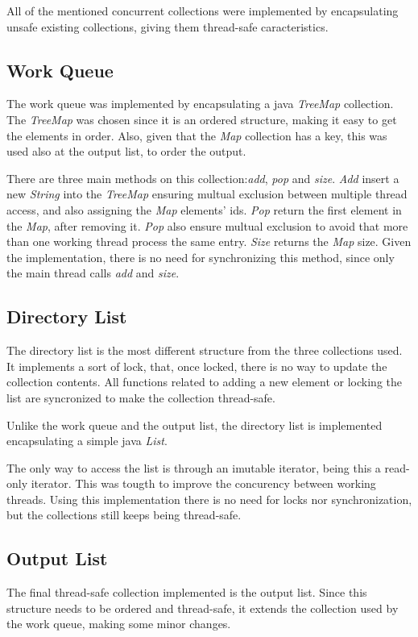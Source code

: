 \documentclass[twocolumn,20pt]{article}
\begin{document}
All of the mentioned concurrent collections were implemented by encapsulating unsafe existing collections, giving them thread-safe caracteristics.

\subsection{Work Queue}
The work queue was implemented by encapsulating a java \textit{TreeMap} collection. The \textit{TreeMap} was chosen since it is an ordered structure, making it easy to get the elements in order. Also, given that the \textit{Map} collection has a key, this was used also at the output list, to order the output.

There are three main methods on this collection:\textit{add}, \textit{pop} and \textit{size}. \textit{Add} insert a new \textit{String} into the \textit{TreeMap} ensuring multual exclusion between multiple thread access, and also assigning the \textit{Map} elements' ids. \textit{Pop} return the first element in the \textit{Map}, after removing it. \textit{Pop} also ensure multual exclusion to avoid that more than one working thread process the same entry. \textit{Size} returns the \textit{Map} size. Given the implementation, there is no need for synchronizing this method, since only the main thread calls \textit{add} and \textit{size}.

\subsection{Directory List}
The directory list is the most different structure from the three collections used. It implements a sort of lock, that, once locked, there is no way to update the collection contents. All functions related to adding a new element or locking the list are syncronized to make the collection thread-safe.

Unlike the work queue and the output list, the directory list is implemented encapsulating a simple java \textit{List}.

The only way to access the list is through an imutable iterator, being this a read-only iterator. This was tougth to improve the concurency between working threads. Using this implementation there is no need for locks nor synchronization, but the collections still keeps being thread-safe.

\subsection{Output List}
The final thread-safe collection implemented is the output list. Since this structure needs to be ordered and thread-safe, it extends the collection used by the work queue, making some minor changes.
\end{document}
